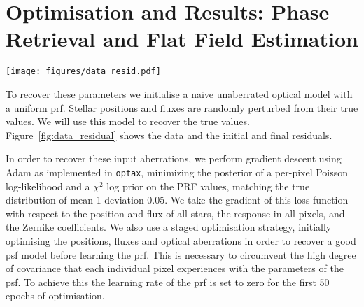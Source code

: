 \documentclass[]{spieman}
\newcommand\optax{\texttt{optax}\xspace}
\begin{document}
\section{Optimisation and Results: Phase Retrieval and Flat Field Estimation}
\label{sec:phaseretrieval}



\begin{figure*}
    \centering
    \texttt{[image: figures/data\_resid.pdf]}
    \caption{Left: single image of the full four that is used to create the full data set. This image has had both photon and detector noise applied. By eye it is clearly difficult to disentangle the astrophysical information. The large number of overlapping \ac{psf}s is chosen in order to spread light across the majority of the detector so that we encode the PRF information for as much of the detector as possible. Middle: the residual of this single image from the data and the initial uncalibrated model. Clearly these residuals are large, showing that there is a large amount of calibration required. Right: this same residual after the model has been optimised. The residual values are much smaller and at the noise floor. A small zoomed region is shown so that the individual pixel-level residuals can be seen.}
    \label{fig:data_residual}
\end{figure*}




To recover these parameters we initialise a naive unaberrated optical model with a uniform \ac{prf}. Stellar positions and fluxes are randomly perturbed from their true values. We will use this model to recover the true values. Figure~\ref{fig:data_residual} shows the data and the initial and final residuals.

In order to recover these input aberrations, we perform gradient descent using Adam \cite{Kingma2014} as implemented in \optax \cite{optax2020github}, minimizing the posterior of a per-pixel Poisson log-likelihood and a $\chi^2$ log prior on the PRF values, matching the true distribution of mean 1 deviation 0.05. We take the gradient of this loss function with respect to the position and flux of all stars, the response in all pixels, and the Zernike coefficients. We also use a staged optimisation strategy, initially optimising the positions, fluxes and optical aberrations in order to recover a good \ac{psf} model before learning the \ac{prf}. This is necessary to circumvent the high degree of covariance that each individual pixel experiences with the parameters of the \ac{psf}. To achieve this the learning rate of the \ac{prf} is set to zero for the first 50 epochs of optimisation.
\end{document}
